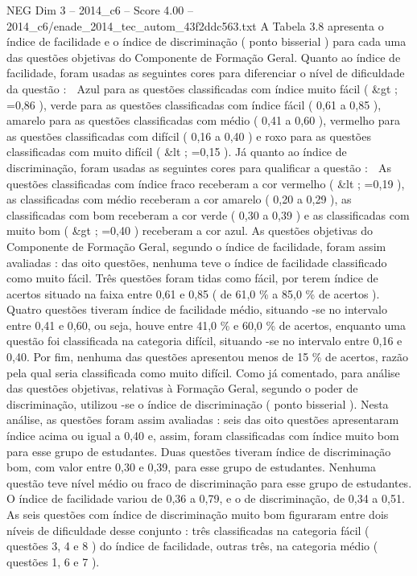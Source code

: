 \begin{textsample}{NEG Dim 3 – 2014\_c6 – Score 4.00 – 2014\_c6/enade\_2014\_tec\_autom\_43f2ddc563.txt}
A Tabela 3.8 apresenta o índice de facilidade e o índice de discriminação ( ponto bisserial ) para cada uma das questões objetivas do Componente de Formação Geral.
Quanto ao índice de facilidade, foram usadas as seguintes cores para diferenciar o nível de dificuldade da questão :  Azul para as questões classificadas com índice muito fácil ( \&gt ; =0,86 ), verde para as questões classificadas com índice fácil ( 0,61 a 0,85 ), amarelo para as questões classificadas com médio ( 0,41 a 0,60 ), vermelho para as questões classificadas com difícil ( 0,16 a 0,40 ) e roxo para as questões classificadas com muito difícil ( \&lt ; =0,15 ).
Já quanto ao índice de discriminação, foram usadas as seguintes cores para qualificar a questão :  As questões classificadas com índice fraco receberam a cor vermelho ( \&lt ; =0,19 ), as classificadas com médio receberam a cor amarelo ( 0,20 a 0,29 ), as classificadas com bom receberam a cor verde ( 0,30 a 0,39 ) e as classificadas com muito bom ( \&gt ; =0,40 ) receberam a cor azul.
As questões objetivas do Componente de Formação Geral, segundo o índice de facilidade, foram assim avaliadas : das oito questões, nenhuma teve o índice de facilidade classificado como muito fácil.
Três questões foram tidas como fácil, por terem índice de acertos situado na faixa entre 0,61 e 0,85 ( de 61,0 \% a 85,0 \% de acertos ).
Quatro questões tiveram índice de facilidade médio, situando -se no intervalo entre 0,41 e 0,60, ou seja, houve entre 41,0 \% e 60,0 \% de acertos, enquanto uma questão foi classificada na categoria difícil, situando -se no intervalo entre 0,16 e 0,40.
Por fim, nenhuma das questões apresentou menos de 15 \% de acertos, razão pela qual seria classificada como muito difícil.
Como já comentado, para análise das questões objetivas, relativas à Formação Geral, segundo o poder de discriminação, utilizou -se o índice de discriminação ( ponto bisserial ).
Nesta análise, as questões foram assim avaliadas : seis das oito questões apresentaram índice acima ou igual a 0,40 e, assim, foram classificadas com índice muito bom para esse grupo de estudantes.
Duas questões tiveram índice de discriminação bom, com valor entre 0,30 e 0,39, para esse grupo de estudantes.
Nenhuma questão teve nível médio ou fraco de discriminação para esse grupo de estudantes.
O índice de facilidade variou de 0,36 a 0,79, e o de discriminação, de 0,34 a 0,51.
As seis questões com índice de discriminação muito bom figuraram entre dois níveis de dificuldade desse conjunto : três classificadas na categoria fácil ( questões 3, 4 e 8 ) do índice de facilidade, outras três, na categoria médio ( questões 1, 6 e 7 ).

\end{textsample}
